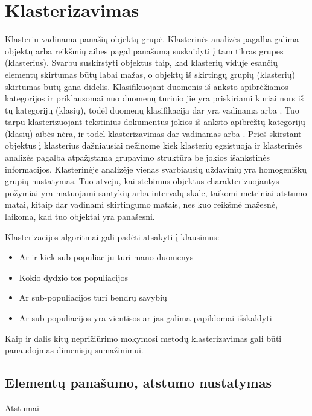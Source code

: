 \documentclass{VUMIFInfKursinis}
\begin{document}
\section{Klasterizavimas}
	Klasteriu vadinama panašių objektų grupė. Klasterinės analizės pagalba galima objektų arba reikšmių aibes pagal panašumą suskaidyti į tam tikras grupes (klasterius). Svarbu suskirstyti objektus taip, kad klasterių viduje esančių elementų skirtumas būtų labai mažas, o objektų iš skirtingų grupių (klasterių) skirtumas būtų gana didelis. 
	Klasifikuojant duomenis iš anksto apibrėžiamos kategorijos ir priklausomai nuo duomenų turinio jie yra priskiriami kuriai nors iš tų kategorijų (klasių), todėl duomenų klasifikacija dar yra vadinama  arba . Tuo tarpu klasterizuojant tekstinius dokumentus jokios iš anksto apibrėžtų kategorijų (klasių) aibės nėra, ir todėl klasterizavimas dar vadinamas  arba . Prieš skirstant objektus į klasterius dažniausiai nežinome kiek klasterių egzistuoja ir klasterinės analizės pagalba atpažįstama grupavimo struktūra be jokios išankstinės informacijos. 
	Klasterinėje analizėje vienas svarbiausių uždavinių yra homogeniškų grupių nustatymas. Tuo atveju, kai stebimus objektus charakterizuojantys požymiai yra matuojami santykių arba intervalų skale, taikomi metriniai atstumo matai, kitaip dar vadinami skirtingumo matais, nes kuo reikšmė mažesnė, laikoma, kad tuo objektai yra panašesni.

	Klasterizacijos algoritmai gali padėti atsakyti į klausimus:
	\begin{itemize}
		\item Ar ir kiek sub-populiaciju turi mano duomenys
		\item Kokio dydzio tos populiacijos
		\item Ar sub-populiacijos turi bendrų savybių
		\item Ar sub-populiacijos yra vientisos ar jas galima papildomai išskaldyti
	\end{itemize}
	Kaip ir dalis kitų neprižiūrimo mokymosi metodų klasterizavimas gali būti panaudojmas dimenisjų sumažinimui. 


	\subsection{Elementų panašumo, atstumo nustatymas}
		Atstumai
\end{document}
